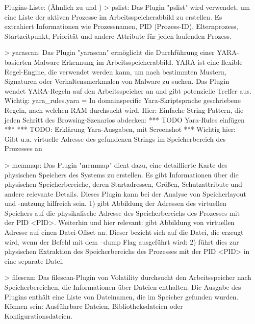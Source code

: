 	Plugins-Liste: (Ähnlich zu \cite{Hariharan} und \cite{Dayalamurthy.2013})
	  > pslist: Das Plugin "pslist" wird verwendet, um eine Liste der aktiven Prozesse im Arbeitsspeicherabbild zu erstellen. Es extrahiert Informationen wie Prozessnamen, PID (Prozess-ID), Elternprozess, Startzeitpunkt, Priorität und andere Attribute für jeden laufenden Prozess.
	
	  > yarascan: Das Plugin "yarascan" ermöglicht die Durchführung einer YARA-basierten Malware-Erkennung im Arbeitsspeicherabbild. YARA ist eine flexible Regel-Engine, die verwendet werden kann, um nach bestimmten Mustern, Signaturen oder Verhaltensmerkmalen von Malware zu suchen. Das Plugin wendet YARA-Regeln auf den Arbeitsspeicher an und gibt potenzielle Treffer aus.
			Wichtig: yara\_rules.yara = In domainspecific Yara-Skriptsprache geschriebene Regeln, nach welchen RAM durchsucht wird.
			Hier: Einfache String-Pattern, die jeden Schritt des Browsing-Szenarios abdecken:
			*** TODO Yara-Rules einfügen ***
			*** TODO: Erklärung Yara-Ausgaben, mit Screenshot ***
			Wichtig hier: Gibt u.a. virtuelle Adresse des gefundenen Strings im Speicherbereich des Prozesses an
		
	  > memmap: Das Plugin "memmap" dient dazu, eine detaillierte Karte des physischen Speichers des Systems zu erstellen. Es gibt Informationen über die physischen Speicherbereiche, deren Startadressen, Größen, Schutzattribute und andere relevante Details. Dieses Plugin kann bei der Analyse von Speicherlayout und -nutzung hilfreich sein.
			1) %
				gibt Abbildung der Adressen des virtuellen Speichers auf die physikalische Adresse des Speicherbereichs des Prozesses mit der PID <PID>.
				Weiterhin und hier relevant: gibt Abbildung von virtuellen Adresse auf einen Datei-Offset an. Dieser bezieht sich auf die Datei, die erzeugt wird, wenn der Befehl mit dem --dump Flag ausgeführt wird:
			2) %
				führt dies zur physischen Extraktion des Speicherbereichs des Prozesses mit der PID <PID> in eine separate Datei.		
	 	
	  > filescan: Das filescan-Plugin von Volatility durchsucht den Arbeitsspeicher nach Speicherbereichen, die Informationen über Dateien enthalten. Die Ausgabe des Plugins enthält eine Liste von Dateinamen, die im Speicher gefunden wurden. Können sein: Ausführbare Dateien, Bibliotheksdateien oder Konfigurationsdateien.
		
